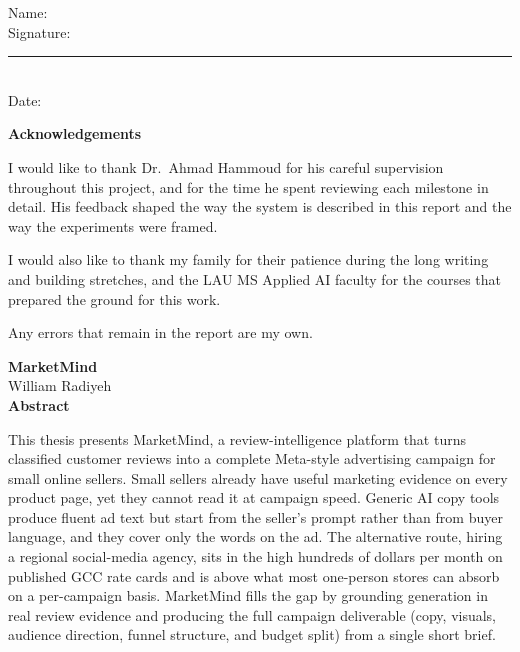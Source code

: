 \documentclass[12pt,a4paper]{report}
\newcommand{\reporttitle}{MarketMind}
\newcommand{\authorname}{William Radiyeh}
\begin{document}
\vspace{1cm}
\noindent Name: \underline{} \\[0.5cm]
\noindent Signature: \rule{3in}{0.4pt} \\[0.5cm]
\noindent Date: \underline{}

\newpage
\begin{center}
{\large \textbf{Acknowledgements}}
\end{center}
\vspace{0.5cm}
I would like to thank Dr.\ Ahmad Hammoud for his careful supervision throughout this project, and for the time he spent reviewing each milestone in detail. His feedback shaped the way the system is described in this report and the way the experiments were framed.

I would also like to thank my family for their patience during the long writing and building stretches, and the LAU MS Applied AI faculty for the courses that prepared the ground for this work.

Any errors that remain in the report are my own.

\newpage
\begin{center}
{\Large \textbf{\reporttitle}}\\[0.3cm]
{\large \authorname}\\[0.8cm]
{\large \textbf{Abstract}}
\end{center}
\vspace{0.5cm}

This thesis presents MarketMind, a review-intelligence platform that turns classified customer reviews into a complete Meta-style advertising campaign for small online sellers. Small sellers already have useful marketing evidence on every product page, yet they cannot read it at campaign speed. Generic AI copy tools produce fluent ad text but start from the seller's prompt rather than from buyer language, and they cover only the words on the ad. The alternative route, hiring a regional social-media agency, sits in the high hundreds of dollars per month on published GCC rate cards and is above what most one-person stores can absorb on a per-campaign basis. MarketMind fills the gap by grounding generation in real review evidence and producing the full campaign deliverable (copy, visuals, audience direction, funnel structure, and budget split) from a single short brief.
\end{document}
